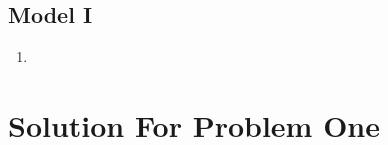 \documentclass[12pt]{article}  %
\begin{document}
\subsection{Model I}

\begin{enumerate}
    \renewcommand{\labelenumi}{\textbf{Step \theenumi}}
    \item 

\end{enumerate}



































































\section{Solution For Problem One}
\end{document}
